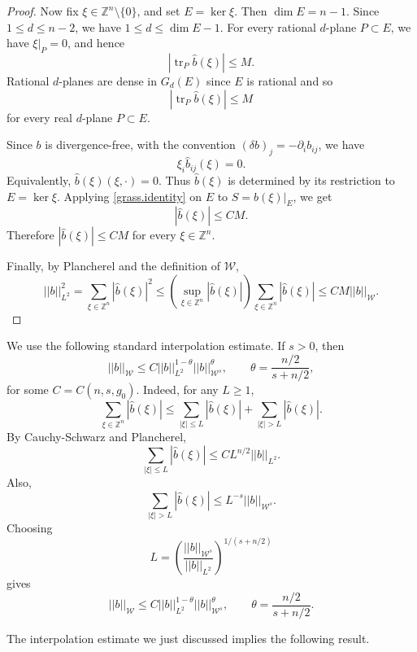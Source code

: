 \documentclass[11pt]{amsart}
\def\Z{\mathbb Z}
\def\tr{\operatorname{tr}}
\theoremstyle{remark}
\theoremstyle{definition}
\begin{document}
\begin{proof}
		Now fix $\xi\in\Z^n\setminus\{0\}$, and set $E=\ker\xi$. Then $\dim E=n-1$. Since $1\leq d\leq n-2$, we have $1\leq d\leq \dim E-1$. For every rational $d$-plane $P\subset E$, we have $\xi|_P=0$, and hence
		$$
		|\tr _P\widehat b(\xi)|\leq M.
		$$
		Rational $d$-planes are dense in $G_d(E)$ {since $E$ is rational} and  so
		$$
		|\tr _P\widehat b(\xi)|\leq M
		$$
		for every real $d$-plane $P\subset E$.
		
		Since $b$ is divergence-free, with the convention $(\delta b)_j=-\partial_i b_{ij}$, we have
		$$
		\xi_i\widehat b_{ij}(\xi)=0.
		$$
		Equivalently, $\widehat b(\xi)(\xi,\cdot)=0$. Thus $\widehat b(\xi)$ is determined by its restriction to $E=\ker\xi$. Applying \eqref{grass.identity} on $E$ to $S=\widehat b(\xi)|_E$, we get
		$$
		|\widehat b(\xi)|\leq C M.
		$$
		Therefore $|\widehat b(\xi)|\leq C M$ for every $\xi\in\Z^n$.
		
		Finally, by Plancherel and the definition of $\mathcal W$,
		$$
		||b||_{L^2}^2 = \sum_{\xi\in\Z^n}|\widehat b(\xi)|^2 \leq \left(\sup_{\xi\in\Z^n}|\widehat b(\xi)|\right) \sum_{\xi\in\Z^n}|\widehat b(\xi)| \leq C M||b||_{\mathcal W}.
		$$
	\end{proof}
	
	
	
	We use the following standard interpolation estimate. If $s>0$, then
	\begin{equation}\label{interpolation}
		||b||_{\mathcal W}\leq C||b||_{L^2}^{1-\theta}||b||_{\mathcal W^s}^{\theta},\qquad
		\theta=\frac{n/2}{s+n/2},
	\end{equation}
	{for some $C=C(n,s,g_0)$.} Indeed, for any $L\geq1$,
	$$
	\sum_{{\xi\in\Z^n}}|\widehat b(\xi)|
	\leq
	\sum_{|\xi|\leq L}|\widehat b(\xi)|+\sum_{|\xi|>L}|\widehat b(\xi)|.
	$$
	By Cauchy-Schwarz and Plancherel,
	$$
	\sum_{|\xi|\leq L}|\widehat b(\xi)|\leq CL^{n/2}||b||_{L^2}.
	$$
	Also,
	$$
	\sum_{|\xi|>L}|\widehat b(\xi)|\leq L^{-s}||b||_{\mathcal W^s}.
	$$
	Choosing
	$$
	L=\left(\frac{||b||_{\mathcal W^s}}{||b||_{L^2}}\right)^{1/(s+n/2)}
	$$
	gives
	$$
	||b||_{\mathcal W}\leq C||b||_{L^2}^{1-\theta}||b||_{\mathcal W^s}^{\theta},\qquad
	\theta=\frac{n/2}{s+n/2}.
	$$
	
	The interpolation estimate we just discussed implies the following result.
	
\end{document}
